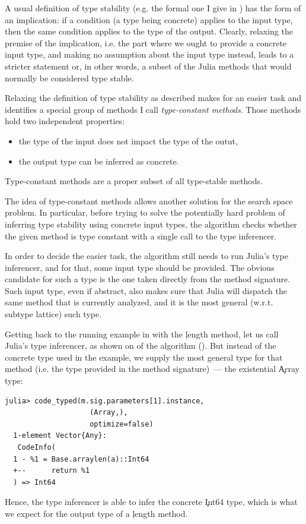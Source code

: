 A usual definition of type stability (e.g. the formal one I give in
) has the form of an implication: if a condition (a type
being concrete) applies to the input type, then the same condition applies to
the type of the output. Clearly, relaxing the premise of the implication, i.e.
the part where we ought to provide a concrete input type, and making no
assumption about the input type instead, leads to a stricter statement or, in
other words, a subset of the Julia methods that would normally be considered
type stable.

Relaxing the definition of type stability as described makes for an easier task
and identifies a special group of methods I call \emph{type-constant methods}.
Those methods hold two independent properties:
\begin{itemize}
  \item the type of the input does not impact the type of the outut, %
  \item the output type can be inferred as concrete.
\end{itemize}
Type-constant methods are a proper subset of all type-stable methods.

The idea of type-constant methods allows another solution for the search space
problem. In particular, before trying to solve the potentially hard problem of
inferring type stability using concrete input types,
the algorithm checks whether the given method is
type constant with a single call to the type inferencer.


In order to decide the easier task, the algorithm still needs to run Julia's
type inferencer, and for that, some input type should be provided. The obvious
candidate for such a type is the one taken directly from the method signature.
Such input type, even if abstract, also makes sure that Julia will dispatch the
same method that is currently analyzed, and it is the most general (w.r.t.
subtype lattice) such type.

Getting back to the running example in  with the
\c{length} method, let us call Julia's type inferencer, as
shown on  of the algorithm (). But
instead of the concrete type used in the example, we supply the most general type
for that method (i.e. the type provided in the method signature)~--- the
existential \c{Array} type:
\begin{lstlisting}[style=jterm]
  julia> code_typed(m.sig.parameters[1].instance,
                    (Array,),
                    optimize=false)
  1-element Vector{Any}:
   CodeInfo(
  1 - %1 = Base.arraylen(a)::Int64
  +--      return %1
  ) => Int64
\end{lstlisting}
Hence, the type inferencer is able to infer the concrete \c{Int64} type, which
is what we expect for the output type of a \c{length} method.

